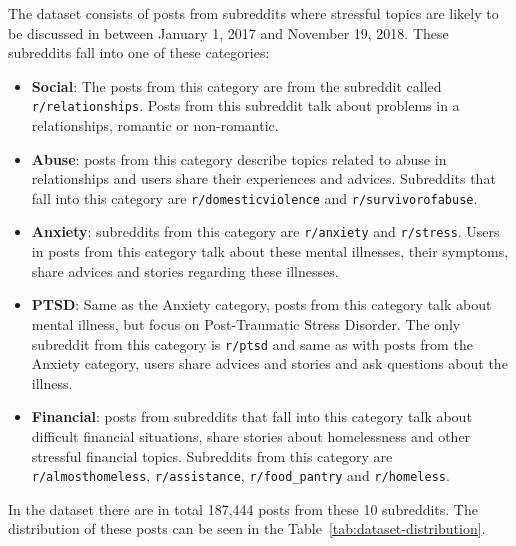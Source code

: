\documentclass[10pt, a4paper]{article}
\begin{document}
The dataset consists of posts from subreddits where stressful topics are likely to be discussed in between January 1, 2017 and November 19, 2018.
These subreddits fall into one of these categories:

\begin{itemize}
    \item \textbf{Social}: The posts from this category are from the subreddit called \verb|r/relationships|.
        Posts from this subreddit talk about problems in a relationships, romantic or non-romantic.
    \item \textbf{Abuse}: posts from this category describe topics related to abuse in relationships and users share their experiences and advices.
        Subreddits that fall into this category are \verb|r/domesticviolence| and \verb|r/survivorofabuse|.
    \item \textbf{Anxiety}: subreddits from this category are \verb|r/anxiety| and \verb|r/stress|.
        Users in posts from this category talk about these mental illnesses, their symptoms, share advices and stories regarding these illnesses.
    \item \textbf{PTSD}: Same as the Anxiety category, posts from this category talk about mental illness, but focus on Post-Traumatic Stress Disorder.
        The only subreddit from this category is \verb|r/ptsd| and same as with posts from the Anxiety category, users share advices and stories and ask questions about the illness.
    \item \textbf{Financial}: posts from subreddits that fall into this category talk about difficult financial situations, share stories about homelessness and other stressful financial topics.
        Subreddits from this category are \verb|r/almosthomeless|, \verb|r/assistance|, \verb|r/food_pantry| and \verb|r/homeless|.
\end{itemize}

In the dataset there are in total 187,444 posts from these 10 subreddits.
The distribution of these posts can be seen in the Table~\ref{tab:dataset-distribution}.
\end{document}

